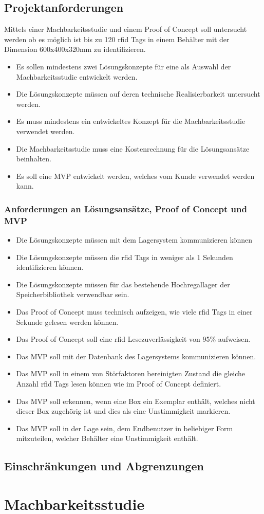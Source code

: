 \subsection{Projektanforderungen}
Mittels einer Machbarkeitsstudie und einem Proof of Concept soll untersucht werden ob es möglich ist bis zu 120 \gls{rfid} Tags in einem Behälter mit der Dimension 600x400x320mm zu identifizieren.

\begin{itemize}
	\item Es sollen mindestens zwei Lösungskonzepte für eine als Auswahl der Machbarkeitsstudie entwickelt werden.
	\item Die Lösungskonzepte müssen auf deren technische Realisierbarkeit untersucht werden.
	\item Es muss mindestens ein entwickeltes Konzept für die Machbarkeitsstudie verwendet werden.
	\item Die Machbarkeitsstudie muss eine Kostenrechnung für die Lösungsansätze beinhalten.
	\item Es soll eine MVP entwickelt werden, welches vom Kunde verwendet werden kann.
\end{itemize}

\subsubsection{Anforderungen an Lösungsansätze, Proof of Concept und MVP}

\begin{itemize}
	\item Die Lösungskonzepte müssen mit dem Lagersystem kommunizieren können
	\item Die Lösungskonzepte müssen die \gls{rfid} Tags in weniger als 1 Sekunden identifizieren können.
	\item Die Lösungskonzepte müssen für das bestehende Hochregallager der Speicherbibliothek verwendbar sein.
	
	\item Das Proof of Concept muss technisch aufzeigen, wie viele \gls{rfid} Tags in einer Sekunde gelesen werden können.
	\item Das Proof of Concept soll eine \gls{rfid} Lesezuverlässigkeit von 95\% aufweisen.
	
	\item Das MVP soll mit der Datenbank des Lagersystems kommunizieren können.
	\item Das MVP soll in einem von Störfaktoren bereinigten Zustand die gleiche Anzahl \gls{rfid} Tags lesen können wie im Proof of Concept definiert.
	\item Das MVP soll erkennen, wenn eine Box ein Exemplar enthält, welches nicht dieser Box zugehörig ist und dies als eine Unstimmigkeit markieren.
	\item Das MVP soll in der Lage sein, dem Endbenutzer in beliebiger Form mitzuteilen, welcher Behälter eine Unstimmigkeit enthält.
\end{itemize}

\subsection{Einschränkungen und Abgrenzungen}

\section{Machbarkeitsstudie}
